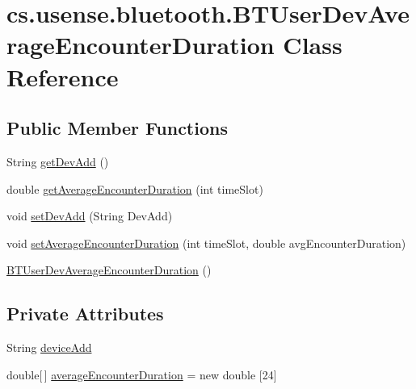 \hypertarget{classcs_1_1usense_1_1bluetooth_1_1_b_t_user_dev_average_encounter_duration}{}\section{cs.\+usense.\+bluetooth.\+B\+T\+User\+Dev\+Average\+Encounter\+Duration Class Reference}
\label{classcs_1_1usense_1_1bluetooth_1_1_b_t_user_dev_average_encounter_duration}
\subsection*{Public Member Functions}
\begin{DoxyCompactItemize}
\item 
String \hyperlink{classcs_1_1usense_1_1bluetooth_1_1_b_t_user_dev_average_encounter_duration_a6d0b0ca017be11aa4b5f5c2e45092460}{get\+Dev\+Add} ()
\item 
double \hyperlink{classcs_1_1usense_1_1bluetooth_1_1_b_t_user_dev_average_encounter_duration_a6ff7e3da77274bfbba4fc84b0c470702}{get\+Average\+Encounter\+Duration} (int time\+Slot)
\item 
void \hyperlink{classcs_1_1usense_1_1bluetooth_1_1_b_t_user_dev_average_encounter_duration_ae1961e60f11f0e27cbe1c51ed77ecad8}{set\+Dev\+Add} (String Dev\+Add)
\item 
void \hyperlink{classcs_1_1usense_1_1bluetooth_1_1_b_t_user_dev_average_encounter_duration_a03c27873d10568b25ea78d26d86906b0}{set\+Average\+Encounter\+Duration} (int time\+Slot, double avg\+Encounter\+Duration)
\item 
\hyperlink{classcs_1_1usense_1_1bluetooth_1_1_b_t_user_dev_average_encounter_duration_af11ecacdf8c945b4b21e4402e03eb626}{B\+T\+User\+Dev\+Average\+Encounter\+Duration} ()
\end{DoxyCompactItemize}
\subsection*{Private Attributes}
\begin{DoxyCompactItemize}
\item 
String \hyperlink{classcs_1_1usense_1_1bluetooth_1_1_b_t_user_dev_average_encounter_duration_abba9d543af176e11a65c0221bb558685}{device\+Add}
\item 
double\mbox{[}$\,$\mbox{]} \hyperlink{classcs_1_1usense_1_1bluetooth_1_1_b_t_user_dev_average_encounter_duration_a21d7be603cc2ed537e6e1aea1139af4d}{average\+Encounter\+Duration} = new double \mbox{[}24\mbox{]}
\end{DoxyCompactItemize}



